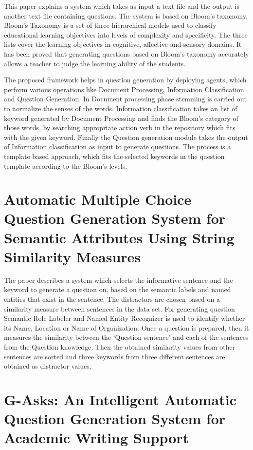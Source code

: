 This paper explains a system which takes as input a text file and the output is
another text file containing questions. The system is based on Bloom’s taxonomy.
Bloom’s Taxonomy is a set of three hierarchical models used to classify
educational learning objectives into levels of complexity and specificity. The
three lists cover the learning objectives in cognitive, affective and sensory
domains. It has been proved that generating questions based on Bloom's taxonomy
accurately allows a teacher to judge the learning ability of the students. 

The proposed framework helps in question generation by deploying agents, which
perform various operations like Document Processing, Information Classification
and Question Generation. In Document processing phase stemming is carried out to
normalize the senses of the words. Information classification takes an list of
keyword generated by Document Processing and finds the Bloom's category of those
words, by searching appropriate action verb in the repository which fits with
the given keyword. Finally the Question generation module takes the output of
Information classification as input to generate questions. The process is a
template based approach, which fits the selected keywords in the question
template according to the Bloom's levels.

\section{Automatic Multiple Choice Question Generation System for Semantic
Attributes Using String Similarity Measures}

The paper describes a system which selects the informative sentence and the
keyword to generate a question on, based on the semantic labels and named
entities that exist in the sentence. The distractors are chosen based on a
similarity measure between sentences in the data set. For generating question
Semantic Role Labeler and Named Entity Recognizer is used to identify whether
its Name, Location or Name of Organization. Once a question is prepared, then it
measures the similarity between the ‘Question sentence’ and each of the
sentences from the Question knowledge. Then the obtained similarity values from
other sentences are sorted and three keywords from three different sentences are
obtained as distractor values.


\section{G-Asks: An Intelligent Automatic Question Generation System for
Academic Writing Support}

